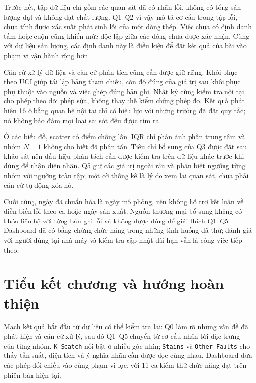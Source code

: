 \documentclass[12pt,a4paper,oneside]{report}
\newcommand{\maCot}[1]{{\urlstyle{tt}\def\UrlBreaks{\do\_\do\/\do\.}\def\UrlBigBreaks{}\nolinkurl{#1}}}
\begin{document}
Trước hết, tập dữ liệu chỉ gồm các quan sát đã có nhãn lỗi, không có tổng sản lượng đạt và không đạt chất lượng. Q1--Q2 vì vậy mô tả cơ cấu trong tập lỗi, chưa tính được xác suất phát sinh lỗi của một dòng thép. Việc chưa có định danh tấm hoặc cuộn cũng khiến mức độc lập giữa các dòng chưa được xác nhận. Cùng với dữ liệu sản lượng, các định danh này là điều kiện để đặt kết quả của bài vào phạm vi vận hành rộng hơn.

Căn cứ xử lý dữ liệu và căn cứ phân tích cũng cần được giữ riêng. Khôi phục theo UCI giúp tái lập bảng tham chiếu, còn độ đúng của giá trị sau khôi phục phụ thuộc vào nguồn và việc ghép đúng bản ghi. Nhật ký cùng kiểm tra nội tại cho phép theo dõi phép sửa, không thay thế kiểm chứng phép đo. Kết quả phát hiện 16 ô bằng quan hệ nội tại chỉ có hiệu lực với những trường đã đặt quy tắc; nó không bảo đảm mọi loại sai sót đều được tìm ra.

Ở các biểu đồ, scatter có điểm chồng lấn, IQR chỉ phản ánh phần trung tâm và nhóm $N=1$ không cho biết độ phân tán. Tiêu chí bổ sung của Q3 được đặt sau khảo sát nên dấu hiệu phân tách cần được kiểm tra trên dữ liệu khác trước khi dùng để nhận diện nhãn. Q5 giữ các giá trị ngoài râu và phân biệt ngưỡng từng nhóm với ngưỡng toàn tập; một cờ thống kê là lý do xem lại quan sát, chưa phải căn cứ tự động xóa nó.

Cuối cùng, ngày đã chuẩn hóa là ngày mô phỏng, nên không hỗ trợ kết luận về diễn biến lỗi theo ca hoặc ngày sản xuất. Nguồn thương mại bổ sung không có khóa liên hệ với từng bản ghi lỗi và không được dùng để giải thích Q1--Q5. Dashboard đã có bằng chứng chức năng trong những tình huống đã thử; đánh giá với người dùng tại nhà máy và kiểm tra cập nhật dài hạn vẫn là công việc tiếp theo.

\section{Tiểu kết chương và hướng hoàn thiện}

Mạch kết quả bắt đầu từ dữ liệu có thể kiểm tra lại: Q0 làm rõ những vấn đề đã phát hiện và căn cứ xử lý, sau đó Q1--Q5 chuyển từ cơ cấu nhãn tới đặc trưng của từng nhóm. \maCot{K_Scatch} nổi bật ở nhiều góc nhìn; \maCot{Stains} và \maCot{Other_Faults} cho thấy tần suất, diện tích và ý nghĩa nhãn cần được đọc cùng nhau. Dashboard đưa các phép đối chiếu vào cùng phạm vi lọc, với 11 ca kiểm thử chức năng đạt trên phiên bản hiện tại.
\end{document}
